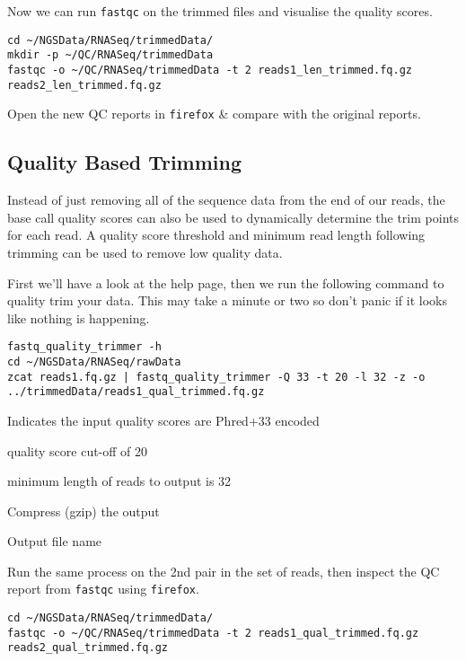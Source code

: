 \begin{steps}
Now we can run \texttt{fastqc} on the trimmed files and visualise the quality scores.
\begin{lstlisting}
cd ~/NGSData/RNASeq/trimmedData/
mkdir -p ~/QC/RNASeq/trimmedData
fastqc -o ~/QC/RNASeq/trimmedData -t 2 reads1_len_trimmed.fq.gz reads2_len_trimmed.fq.gz
\end{lstlisting}
Open the new QC reports in \texttt{firefox} \& compare with the original reports.
\end{steps}


\subsection{Quality Based Trimming}
Instead of just removing all of the sequence data from the end of our reads, the base call quality scores can also be used to dynamically determine the trim points for each read. 
A quality score threshold and minimum read length following trimming can be used to remove low quality data. \\
\begin{steps}
First we'll have a look at the help page, then we  run the following command to quality trim your data.
This may take a minute or two so don't panic if it looks like nothing is happening.
\begin{lstlisting}
fastq_quality_trimmer -h
cd ~/NGSData/RNASeq/rawData
zcat reads1.fq.gz | fastq_quality_trimmer -Q 33 -t 20 -l 32 -z -o ../trimmedData/reads1_qual_trimmed.fq.gz
\end{lstlisting}
\end{steps}

\begin{note}
\begin{description}[style=multiline,labelindent=0cm,align=right,leftmargin=0.8\descriptionlabelspace,rightmargin=1.5cm,font=\ttfamily]
\item[-Q 33] Indicates the input quality scores are Phred+33 encoded
\item[-t 20] quality score cut-off of 20
\item[-l 32] minimum length of reads to output is 32
\item[-z] Compress (gzip) the output
\item[-o] Output file name
\end{description}
\end{note}

\begin{steps}
Run the same process on the 2nd pair in the set of reads, then inspect the QC report from \texttt{fastqc} using \texttt{firefox}.
\begin{lstlisting}
cd ~/NGSData/RNASeq/trimmedData/
fastqc -o ~/QC/RNASeq/trimmedData -t 2 reads1_qual_trimmed.fq.gz reads2_qual_trimmed.fq.gz
\end{lstlisting}
\end{steps}

